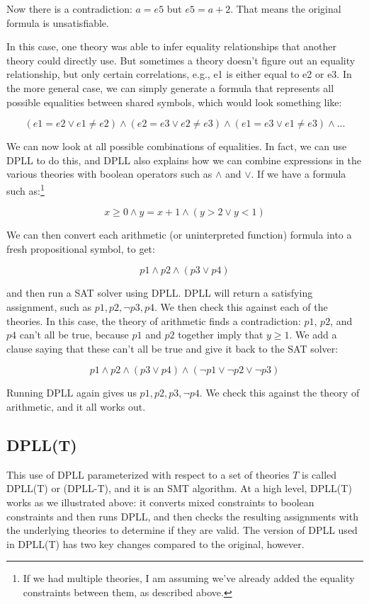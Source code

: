 \documentclass[11pt]{article}
\begin{document}
Now there is a contradiction: $a = e5$ but $e5 = a + 2$. That means the original
formula is unsatisfiable.

In this case, one theory was able to infer equality relationships that another
theory could directly use. But sometimes a theory doesn't figure out an equality
relationship, but only certain correlations, e.g., e1 is either equal to e2 or
e3. In the more general case, we can simply generate a formula that represents
all possible equalities between shared symbols, which would look something like:

\[
(e1 = e2 \lor e1 \neq e2) \land (e2 = e3 \lor e2 \neq e3) \land (e1 = e3 \lor e1 \neq e3) \land ...
\]

We can now look at all possible combinations of equalities. In fact, we can use
DPLL to do this, and DPLL also explains how we can combine expressions in the
various theories with boolean operators such as $\land$ and $\lor$. If we have a
formula such as:\footnote{If we had multiple theories, I am assuming we've
  already added the equality constraints between them, as described above.}

\[
x \geq 0 \land y = x + 1 \land (y > 2 \lor y < 1)
\]

We can then convert each arithmetic (or uninterpreted function) formula into a
fresh propositional symbol, to get:

\[
p1 \land p2 \land (p3 \lor p4)
\]

and then run a SAT solver using DPLL. DPLL will return a satisfying assignment,
such as $p1, p2, \lnot p3, p4$. We then check this against each of the theories.
In this case, the theory of arithmetic finds a contradiction: $p1$, $p2$, and
$p4$ can't all be true, because $p1$ and $p2$ together imply that $y \ge 1$. We
add a clause saying that these can't all be true and give it back to the SAT
solver:

\[
p1 \land p2 \land (p3 \lor p4) \land (\lnot p1 \lor \lnot p2 \lor \lnot p3)
\]

Running DPLL again gives us $p1, p2, p3, \lnot p4$. We check this against the
theory of arithmetic, and it all works out.

\subsection{DPLL(T)} 

This use of DPLL parameterized with respect to a set of theories $T$ is called
DPLL(T) or (DPLL-T), and it is an SMT algorithm. 
%
At a high level, DPLL(T) works as we illustrated above: it converts mixed
constraints to boolean constraints and then runs DPLL, and then checks the
resulting assignments with the underlying theories to determine if they are
valid. The version of DPLL used in DPLL(T) has two key changes compared to the
original, however.
\end{document}
